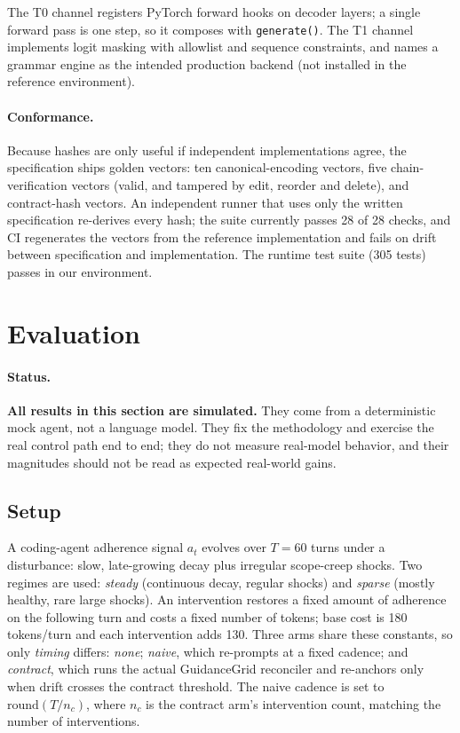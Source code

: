 \documentclass[11pt]{article}
\newcommand{\rt}{GuidanceGrid}
\newcommand{\code}[1]{\texttt{#1}}
\begin{document}
The T0 channel registers PyTorch forward hooks on decoder layers; a single forward
pass is one step, so it composes with \code{generate()}. The T1 channel implements
logit masking with allowlist and sequence constraints, and names a grammar engine
\citep{willard2023outlines} as the intended production backend (not installed in
the reference environment).

\paragraph{Conformance.}
Because hashes are only useful if independent implementations agree, the
specification ships golden vectors: ten canonical-encoding vectors, five
chain-verification vectors (valid, and tampered by edit, reorder and delete), and
contract-hash vectors. An independent runner that uses only the written
specification re-derives every hash; the suite currently passes 28 of 28 checks,
and CI regenerates the vectors from the reference implementation and fails on
drift between specification and implementation. The runtime test suite (305 tests)
passes in our environment.

\section{Evaluation}
\label{sec:eval}

\paragraph{Status.}
\textbf{All results in this section are simulated.} They come from a deterministic
mock agent, not a language model. They fix the methodology and exercise the real
control path end to end; they do not measure real-model behavior, and their
magnitudes should not be read as expected real-world gains.

\subsection{Setup}
A coding-agent adherence signal $a_t$ evolves over $T=60$ turns under a
disturbance: slow, late-growing decay plus irregular scope-creep shocks. Two
regimes are used: \emph{steady} (continuous decay, regular shocks) and
\emph{sparse} (mostly healthy, rare large shocks). An intervention restores a
fixed amount of adherence on the following turn and costs a fixed number of
tokens; base cost is 180 tokens/turn and each intervention adds 130. Three arms
share these constants, so only \emph{timing} differs:
\emph{none}; \emph{naive}, which re-prompts at a fixed cadence; and
\emph{contract}, which runs the actual \rt{} reconciler and re-anchors only when
drift crosses the contract threshold. The naive cadence is set to
$\mathrm{round}(T/n_c)$, where $n_c$ is the contract arm's intervention count,
matching the number of interventions.
\end{document}
